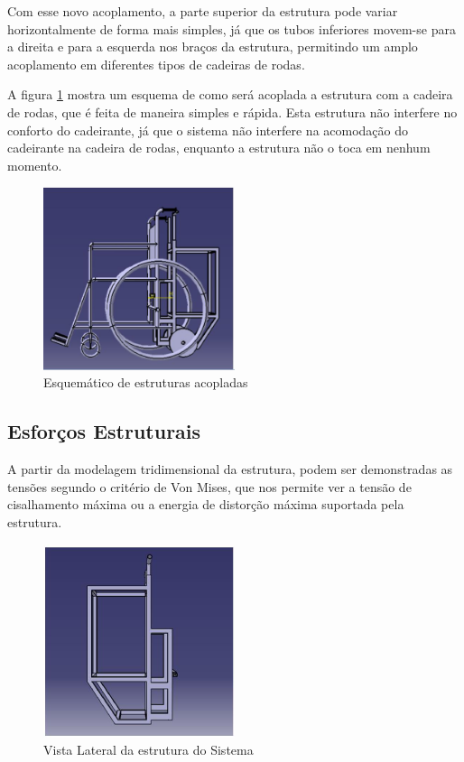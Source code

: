Com esse novo acoplamento, a parte superior da estrutura pode variar horizontalmente de forma mais simples, já que os tubos inferiores movem-se para a direita e para a esquerda nos braços da estrutura, permitindo um amplo acoplamento em diferentes tipos de cadeiras de rodas.

A figura \ref{fig:esquematico_estr_acoplada} mostra um esquema de como será acoplada a estrutura com a cadeira de rodas, que é feita de maneira simples e rápida. Esta estrutura não interfere no conforto do cadeirante, já que o sistema não interfere na acomodação do cadeirante na cadeira de rodas, enquanto a estrutura não o toca em nenhum momento.

\begin{figure}[!htb]
\centering
\includegraphics[width=0.5\textwidth]{figuras/resultados/esquematico_estr_acoplada}
\caption{Esquemático de estruturas acopladas}
\label{fig:esquematico_estr_acoplada}
\end{figure}

 \subsection{Esforços Estruturais}

A partir da modelagem tridimensional da estrutura, podem ser demonstradas as tensões segundo o critério de Von Mises, que nos permite ver a tensão de cisalhamento máxima ou a energia de distorção máxima suportada pela estrutura.

\begin{figure}[!htb]
\centering
\includegraphics[width=0.5\textwidth]{figuras/resultados/vista_lateral_estrutura}
\caption{Vista Lateral da estrutura do Sistema}
\label{fig:vista_lateral_estrutura}
\end{figure}

